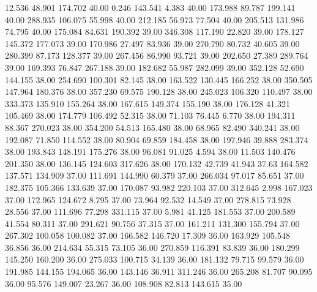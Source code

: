   12.536   48.901  174.702        40.00
   0.246  143.541    4.383        40.00
 173.988   89.787  199.141        40.00
 288.935  106.075   55.998        40.00
 212.185   56.973   77.504        40.00
 205.513  131.986   74.795        40.00
 175.084   84.631  190.392        39.00
 346.308  117.190   22.820        39.00
 178.127  145.372  177.073        39.00
 170.986   27.497   83.936        39.00
 270.790   80.732   40.605        39.00
 280.399   87.173  128.377        39.00
 267.456   86.990   93.721        39.00
 202.650   27.389  289.764        39.00
 169.393   76.847  267.188        39.00
 182.682   55.987  282.099        39.00
 352.128   52.690  144.155        38.00
 254.690  100.301   82.145        38.00
 163.522  130.445  166.252        38.00
 350.505  147.964  180.376        38.00
 357.230   69.575  190.128        38.00
 245.023  106.320  110.497        38.00
 333.373  135.910  155.264        38.00
 167.615  149.374  155.190        38.00
 176.128   41.321  105.469        38.00
 174.779  106.492   52.315        38.00
  71.103   76.445    6.770        38.00
 194.311   88.367  270.023        38.00
 354.200   54.513  165.480        38.00
  68.965   82.490  340.241        38.00
 192.087   71.850  114.552        38.00
  80.904   69.859  184.458        38.00
 197.946   39.888  283.374        38.00
 193.843  148.191  175.276        38.00
  96.081   91.025    4.594        38.00
  11.503  140.476  201.350        38.00
 136.145  124.603  317.626        38.00
 170.132   42.739   41.943        37.63
 164.582  137.571  134.909        37.00
 111.691  144.990   60.379        37.00
 266.034   97.017   85.651        37.00
 182.375  105.366  133.639        37.00
 170.087   93.982  220.103        37.00
 312.645    2.998  167.023        37.00
 172.965  124.672    8.795        37.00
  73.964   92.532   14.549        37.00
 278.815   73.928   28.556        37.00
 111.696   77.298  331.115        37.00
   5.981   41.125  181.553        37.00
 200.589   41.554   80.311        37.00
 291.621   90.756   37.315        37.00
 161.211  131.300  155.794        37.00
 267.302  100.058  100.082        37.00
 166.582  146.720   17.309        36.00
 163.929  105.548   36.856        36.00
 214.634   55.315   73.105        36.00
 270.859  116.391   83.839        36.00
 180.299  145.250  160.200        36.00
 275.033  100.715   34.139        36.00
 181.132   79.715   99.579        36.00
 191.985  144.155  194.065        36.00
 143.146   36.911  311.246        36.00
 265.208   81.707   90.095        36.00
  95.576  149.007   23.267        36.00
 108.908   82.813  143.615        35.00
